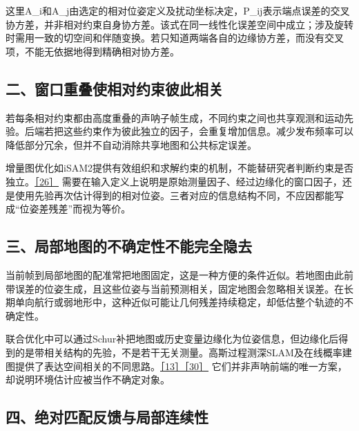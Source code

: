 这里A\_i和A\_j由选定的相对位姿定义及扰动坐标决定，P\_ij表示端点误差的交叉协方差，并非相对约束自身协方差。该式在同一线性化误差空间中成立；涉及旋转时需用一致的切空间和伴随变换。若只知道两端各自的边缘协方差，而没有交叉项，不能无依据地得到精确相对协方差。

\hypertarget{ux4e8cux7a97ux53e3ux91cdux53e0ux4f7fux76f8ux5bf9ux7ea6ux675fux5f7cux6b64ux76f8ux5173}{%
\subsection{二、窗口重叠使相对约束彼此相关}\label{ux4e8cux7a97ux53e3ux91cdux53e0ux4f7fux76f8ux5bf9ux7ea6ux675fux5f7cux6b64ux76f8ux5173}}

若每条相对约束都由高度重叠的声呐子帧生成，不同约束之间也共享观测和运动先验。后端若把这些约束作为彼此独立的因子，会重复增加信息。减少发布频率可以降低部分冗余，但并不自动消除共享地图和公共标定误差。

增量图优化如iSAM2提供有效组织和求解约束的机制，不能替研究者判断约束是否独立。\href{https://www.borg.cc.gatech.edu/papers/kaess12ijrr.html}{［26］} 需要在输入定义上说明是原始测量因子、经过边缘化的窗口因子，还是使用先验再次估计得到的相对位姿。三者对应的信息结构不同，不应因都能写成``位姿差残差''而视为等价。

\hypertarget{ux4e09ux5c40ux90e8ux5730ux56feux7684ux4e0dux786eux5b9aux6027ux4e0dux80fdux5b8cux5168ux9690ux53bb}{%
\subsection{三、局部地图的不确定性不能完全隐去}\label{ux4e09ux5c40ux90e8ux5730ux56feux7684ux4e0dux786eux5b9aux6027ux4e0dux80fdux5b8cux5168ux9690ux53bb}}

当前帧到局部地图的配准常把地图固定，这是一种方便的条件近似。若地图由此前带误差的位姿生成，且这些位姿与当前预测相关，固定地图会忽略相关误差。在长期单向航行或弱地形中，这种近似可能让几何残差持续稳定，却低估整个轨迹的不确定性。

联合优化中可以通过Schur补把地图或历史变量边缘化为位姿信息，但边缘化后得到的是带相关结构的先验，不是若干无关测量。高斯过程测深SLAM及在线概率建图提供了表达空间相关的不同思路。\href{https://www-personal.acfr.usyd.edu.au/sbarkby/2011_iros_bpslam.pdf}{［13］}\href{https://arxiv.org/abs/2211.05601}{［30］} 它们并非声呐前端的唯一方案，却说明环境估计应被当作不确定对象。

\hypertarget{ux56dbux7eddux5bf9ux5339ux914dux53cdux9988ux4e0eux5c40ux90e8ux8fdeux7eedux6027}{%
\subsection{四、绝对匹配反馈与局部连续性}\label{ux56dbux7eddux5bf9ux5339ux914dux53cdux9988ux4e0eux5c40ux90e8ux8fdeux7eedux6027}}

